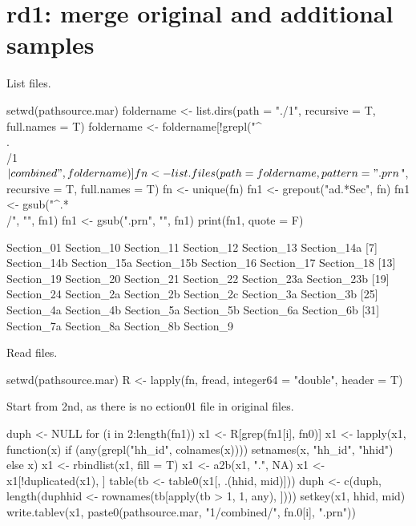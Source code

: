 \section{rd1: merge original and additional samples}

List files.
\begin{Schunk}
\begin{Sinput}
setwd(pathsource.mar)
foldername <- list.dirs(path = "./1", recursive = T, full.names = T)
foldername <- foldername[!grepl("^\\.\\/1$|combined", foldername)]
fn <- list.files(path = foldername, pattern = ".prn$", 
	recursive = T, full.names = T)
fn <- unique(fn)
fn1 <- grepout("ad.*Sec", fn)
fn1 <- gsub("^.*\\/", "", fn1)
fn1 <- gsub(".prn", "", fn1)
print(fn1, quote = F)
\end{Sinput}
\begin{Soutput}
 [1] Section_01  Section_10  Section_11  Section_12  Section_13  Section_14a
 [7] Section_14b Section_15a Section_15b Section_16  Section_17  Section_18 
[13] Section_19  Section_20  Section_21  Section_22  Section_23a Section_23b
[19] Section_24  Section_2a  Section_2b  Section_2c  Section_3a  Section_3b 
[25] Section_4a  Section_4b  Section_5a  Section_5b  Section_6a  Section_6b 
[31] Section_7a  Section_8a  Section_8b  Section_9  
\end{Soutput}
\end{Schunk}
Read files.
\begin{Schunk}
\begin{Sinput}
setwd(pathsource.mar)
R <- lapply(fn, fread, integer64 = "double", header = T)
\end{Sinput}
\end{Schunk}
Start from 2nd, as there is no ection01 file in original files.
\begin{Schunk}
\begin{Sinput}
duph <- NULL
for (i in 2:length(fn1)) {
	x1 <- R[grep(fn1[i], fn0)]
	x1 <- lapply(x1, function(x) 
	if (any(grepl("hh_id", colnames(x)))) setnames(x, "hh_id", "hhid") else x)
	x1 <- rbindlist(x1, fill = T)
	x1 <- a2b(x1, ".", NA)
	x1 <- x1[!duplicated(x1), ]
	table(tb <- table0(x1[, .(hhid, mid)]))
	duph <- c(duph, length(duphhid <- rownames(tb[apply(tb > 1, 1, any), ])))
	setkey(x1, hhid, mid)
	write.tablev(x1, paste0(pathsource.mar, "1/combined/", fn.0[i], ".prn"))
}
\end{Sinput}
\end{Schunk}
